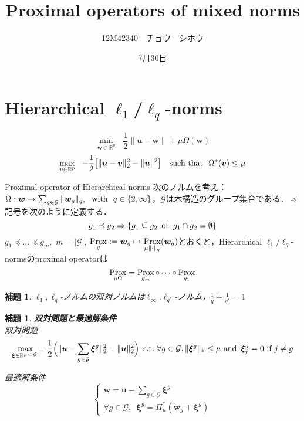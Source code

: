 \documentclass[a4paper,11pt]{jsarticle}
\title{Proximal operators of mixed norms}
\author{12M42340　チョウ　シホウ}
\date{7月30日}
\newtheorem{lemma}[theorem]{補題}
\numberwithin{theorem}{section}  %
\numberwithin{equation}{section} %
\newcommand{\prox}{\mathop{\mathrm{\rm Prox}}\limits}
\begin{document}
{}
\renewcommand{\thepart}{\arabic{part}}


\section{Hierarchical $\ell_1$/$\ell_q$-norms}
\begin{equation}
\min_{\bm{w} \in \mathbb{R}^p}\,\,\,\, \frac{1}{2} \|\bm{u} - \bm{w}\| + \mu \Omega(\bm{w})
\end{equation}
\begin{equation}
\max_{\bm{v} \in \mathbb{R}^p}\,\,\,\, -\frac{1}{2}\bigr[ \|\bm{u} - \bm{v}\|_2^2 - \|\bm{u}\|^2 \bigr] \text{\,\,\,\,\,\,such that\,\,\,\,}\Omega^*(\bm{v})\le \mu
\end{equation}

\begin{itembox}[l]{Proximal operator of Hierarchical norms}
次のノルムを考え：
$\Omega:\bm{w} \to \sum_{g\in\mathcal{G}}\|\bm{w}_g\|_q,\text{\,\,\,\,with\,\,\,\,}q\in\{2,\infty\}$，$\mathcal{G}$は木構造のグループ集合である．$\preceq$記号を次のように定義する．
\[
g_1 \preceq g_2 \Rightarrow \{ g_1 \subseteq g_2 \text{\,\,\,or\,\,\,} g_1 \cap g_2 = \emptyset  \}
\]
$g_1 \preceq \dots \preceq g_m,\,\,m=|\mathcal{G}|$,
$\prox_g := \bm{w}_g \mapsto \prox_{\mu\|\cdot\|_q}(\bm{w}_g)$とおくと，Hierarchical $\ell_1$/$\ell_q$-normsのproximal operatorは
\[
\prox_{\mu\Omega}=\prox_{g_m}\circ\dots\circ\prox_{g_1}
\]
\end{itembox}
\begin{lemma} $\ell_1,\ell_q$-ノルムの双対ノルムは$\ell_\infty.\ell_{q^*}$-ノルム，$\frac{1}{q}+\frac{1}{q^*}=1$
\end{lemma}
\begin{lemma} {\bf 双対問題と最適解条件\\}
双対問題
\begin{equation}
\max_{\bm{\xi}\in \mathbb{R}^{p \times |\mathcal{G}|}} -\frac{1}{2}\Bigr(\| \bm{u} - \sum_{g\in\mathcal{G}} \bm{\xi}^g \|_2^2 - \|\bm{u}\|_2^2 \Bigr)  \text{\,\,\,s.t.\,\,}\forall g\in\mathcal{G},\|\bm{\xi}^g\|_* \le \mu \text{\,\,and\,\,\,}\bm{\xi}_j^g=0 \text{\,\,if\,\,}j\neq g
\end{equation}

最適解条件
\begin{equation}
\begin{cases}
\bm{w} = \bm{u} - \sum_{g\in \mathcal{G}} \bm{\xi}^g \\
\forall g \in \mathcal{G},\,\,\, \bm{\xi}^g = \Pi_{\mu}^*(\bm{w}_g + \bm{\xi}^g)
\end{cases}
\end{equation}
\end{lemma}
\end{document}
